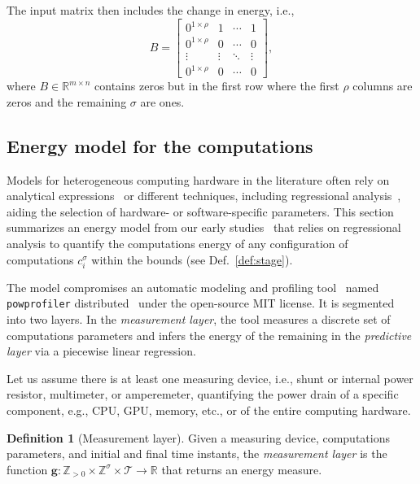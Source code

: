 \documentclass[letterpaper,10pt,journal,twoside]{IEEEtran}
\newcommand{\stt}[1]{{\small\tt #1}} %
\newcommand{\powprof}{\stt{powprofiler}}
\theoremstyle{definition}
\newtheorem{defn}{Definition}[section]
\begin{document}
The input matrix then includes the change in energy, i.e.,
\begin{equation}\label{eq:mat_B}
  B=\begin{bmatrix}
      0^{1\times\rho} & 1      & \cdots & 1      \\
      0^{1\times\rho} & 0      & \cdots & 0      \\ 
      \vdots          & \vdots & \ddots & \vdots \\
      0^{1\times\rho} & 0      & \cdots & 0   
  \end{bmatrix},
\end{equation}
where $B\in\mathbb{R}^{m\times n}$ contains zeros but in the first row where the first $\rho$ columns are zeros and the remaining $\sigma$ are ones. 

\vspace*{-1.5ex}
\subsection{Energy model for the computations}
\label{sec:mod-com}

Models for heterogeneous computing hardware in the literature often rely on analytical expressions~\cite{marowka2017energy,goraczko2008energy,calore2015energy,yang2017designing} or different techniques, including regressional analysis~\cite{bailey2014adaptive,ma2012holistic,seewald2019coarse}, aiding the selection of hardware- or software-specific parameters. This section summarizes an energy model from our early studies~\cite{seewald2019component,seewald2019coarse} that relies on regressional analysis to quantify the computations energy of any configuration of computations $c_i^\sigma$ within the bounds (see Def.~\ref{def:stage}).

The model compromises an automatic modeling and profiling tool~\cite{seewald2019coarse} named \powprof{} distributed~\cite{powprofiler} under the open-source MIT license. It is segmented into two layers. In the \emph{measurement layer}, the tool measures a discrete set of computations parameters and infers the energy of the remaining in the \emph{predictive layer} via a piecewise linear regression.

Let us assume there is at least one measuring device, i.e., shunt or internal power resistor, multimeter, or amperemeter, quantifying the power drain of a specific component, e.g., CPU, GPU, memory, etc., or of the entire computing hardware.

\begin{defn}[Measurement layer]\label{def:meas}
  Given a measuring device, computations parameters, and initial and final time instants, the \emph{measurement layer} is the function $\mathbf{g}:\mathbb{Z}_{>0}\times\mathbb{Z}^\sigma\times\mathcal{T}\rightarrow\mathbb{R}$ that returns an energy measure.
\end{defn}
\end{document}
